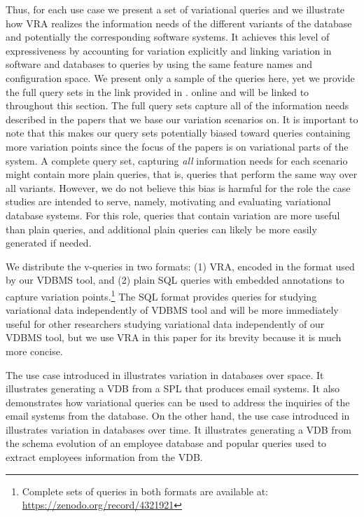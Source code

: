 %
Thus, for each use case we present a set of variational queries 
and we illustrate how VRA realizes the
information needs of the different variants of the database and potentially the 
corresponding software systems.
%
It achieves this level of expressiveness by accounting 
for variation explicitly and linking variation in software and databases to
queries by using the same feature names and configuration space.
%
We present only a  sample of the queries here,
yet we provide the full query sets in the link provided in .
online and will be linked to throughout this
section.
The full query sets capture all of the information needs described in the
papers that  we base our variation scenarios on. It is important to note that
this makes our query sets potentially biased toward queries containing more
variation points since the focus of the papers is on variational parts of the
system. A complete query set, capturing \emph{all}
information needs for each scenario might contain more plain queries, that is,
queries that perform the same way over all variants.
%
However, we do not believe this bias is harmful for the role the case studies
are intended to serve, namely, motivating and evaluating variational database
systems. For this role, queries that contain variation are more useful than
plain queries, and additional plain queries can likely be more easily generated
if needed.

We distribute the v-queries in two formats: (1) VRA,
encoded in the format used by
our VDBMS tool, and (2) plain SQL queries with embedded 
annotations to capture variation points.\footnote{Complete sets of queries in both formats are available at: \url{https://zenodo.org/record/4321921}} 
%
The SQL format provides queries for studying variational data 
independently of VDBMS tool and
will be more immediately useful for other researchers
studying variational data independently of our VDBMS tool, 
but we use VRA in
this paper for its brevity
because it is much more concise.

The use case introduced in  illustrates variation in databases over space. 
It illustrates generating a VDB from a SPL that produces email systems. It also demonstrates
how variational queries can be used to address the inquiries of the email systems from the
database. 
On the other hand, the use case introduced in  illustrates variation in 
databases over time. It illustrates generating a VDB from the schema evolution of 
an employee database and popular queries used to extract employees information
from the VDB.

